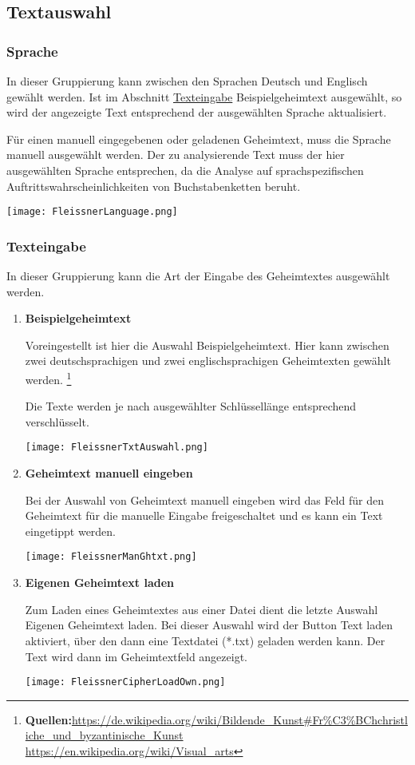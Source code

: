 \documentclass[fontsize=12pt, DIV=15, parskip=half-]{scrartcl}
\theoremstyle{break}
\begin{document}
\subsection{Textauswahl} \hypertarget{txtausw}{}
\subsubsection{Sprache}
In dieser Gruppierung kann zwischen den Sprachen \glqq Deutsch\grqq{} und \glqq Englisch\grqq{} gewählt werden. Ist im Abschnitt \hyperlink{txteing}{Texteingabe} \glqq Beispielgeheimtext\grqq{} ausgewählt, so wird der angezeigte Text entsprechend der ausgewählten Sprache aktualisiert. 

Für einen manuell eingegebenen oder geladenen Geheimtext, muss die Sprache manuell ausgewählt werden. Der zu analysierende Text muss der hier ausgewählten Sprache entsprechen, da die Analyse auf sprachspezifischen Auftrittswahrscheinlichkeiten von Buchstabenketten beruht.

\texttt{[image: FleissnerLanguage.png]}
\newpage

\subsubsection{Texteingabe}\hypertarget{txteing}{}
In dieser Gruppierung kann die Art der Eingabe des Geheimtextes ausgewählt werden.

\begin{enumerate}[label=(\alph*), leftmargin=*]
\item \textbf{Beispielgeheimtext}

Voreingestellt ist hier die Auswahl \glqq Beispielgeheimtext\grqq. 
Hier kann zwischen zwei deutschsprachigen und zwei englischsprachigen
Geheimtexten gewählt werden. \footnote{\textbf{Quellen:}\url{https://de.wikipedia.org/wiki/Bildende_Kunst\#Fr\%C3\%BChchristliche_und_byzantinische_Kunst}\\ \url{https://en.wikipedia.org/wiki/Visual_arts}} 

Die Texte werden je nach ausgewählter Schlüssellänge entsprechend verschlüsselt. 

\texttt{[image: FleissnerTxtAuswahl.png]}
\newpage

\item \textbf{Geheimtext manuell eingeben}

Bei der Auswahl von \glqq Geheimtext manuell eingeben\grqq{} wird das Feld für den Geheimtext für die manuelle Eingabe freigeschaltet und es kann ein Text eingetippt werden.

\texttt{[image: FleissnerManGhtxt.png]}

\item \textbf{Eigenen Geheimtext laden}

Zum Laden eines Geheimtextes aus einer Datei dient die letzte Auswahl \glqq Eigenen Geheimtext laden\grqq.
Bei dieser Auswahl wird der Button \glqq Text laden\grqq{} aktiviert, über den dann eine Textdatei (*.txt) geladen werden kann. Der Text wird dann im Geheimtextfeld angezeigt.

\texttt{[image: FleissnerCipherLoadOwn.png]}
\end{enumerate} 
\end{document}
